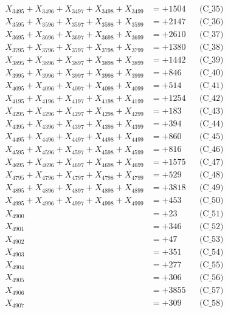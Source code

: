\documentclass[a4paper,10pt]{article}
\begin{document}
{\begin{align}
X_{3495} + X_{3496} + X_{3497} + X_{3498} + X_{3499} &= +1504 && \text{(C\_35)} \\
\allowbreak
X_{3595} + X_{3596} + X_{3597} + X_{3598} + X_{3599} &= +2147 && \text{(C\_36)} \\
X_{3695} + X_{3696} + X_{3697} + X_{3698} + X_{3699} &= +2610 && \text{(C\_37)} \\
X_{3795} + X_{3796} + X_{3797} + X_{3798} + X_{3799} &= +1380 && \text{(C\_38)} \\
X_{3895} + X_{3896} + X_{3897} + X_{3898} + X_{3899} &= +1442 && \text{(C\_39)} \\
X_{3995} + X_{3996} + X_{3997} + X_{3998} + X_{3999} &= +846 && \text{(C\_40)} \\
\allowbreak
X_{4095} + X_{4096} + X_{4097} + X_{4098} + X_{4099} &= +514 && \text{(C\_41)} \\
X_{4195} + X_{4196} + X_{4197} + X_{4198} + X_{4199} &= +1254 && \text{(C\_42)} \\
X_{4295} + X_{4296} + X_{4297} + X_{4298} + X_{4299} &= +183 && \text{(C\_43)} \\
X_{4395} + X_{4396} + X_{4397} + X_{4398} + X_{4399} &= +394 && \text{(C\_44)} \\
X_{4495} + X_{4496} + X_{4497} + X_{4498} + X_{4499} &= +860 && \text{(C\_45)} \\
\allowbreak
X_{4595} + X_{4596} + X_{4597} + X_{4598} + X_{4599} &= +816 && \text{(C\_46)} \\
X_{4695} + X_{4696} + X_{4697} + X_{4698} + X_{4699} &= +1575 && \text{(C\_47)} \\
X_{4795} + X_{4796} + X_{4797} + X_{4798} + X_{4799} &= +529 && \text{(C\_48)} \\
X_{4895} + X_{4896} + X_{4897} + X_{4898} + X_{4899} &= +3818 && \text{(C\_49)} \\
X_{4995} + X_{4996} + X_{4997} + X_{4998} + X_{4999} &= +453 && \text{(C\_50)} \\
\allowbreak
X_{4900} &= +23 && \text{(C\_51)} \\
X_{4901} &= +346 && \text{(C\_52)} \\
X_{4902} &= +47 && \text{(C\_53)} \\
X_{4903} &= +351 && \text{(C\_54)} \\
X_{4904} &= +277 && \text{(C\_55)} \\
\allowbreak
X_{4905} &= +306 && \text{(C\_56)} \\
X_{4906} &= +3855 && \text{(C\_57)} \\
X_{4907} &= +309 && \text{(C\_58)} \\

\end{align}}
\end{document}
